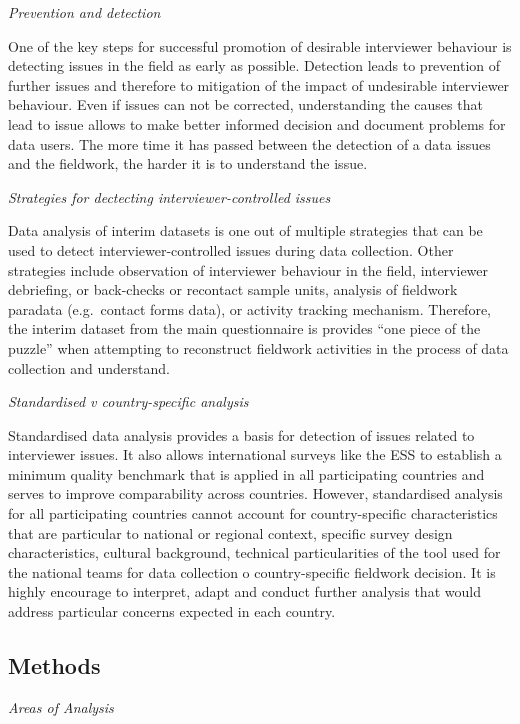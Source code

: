 \documentclass[
  11pt,
  a4paperpaper,
]{article}
\begin{document}
\emph{Prevention and detection}

One of the key steps for successful promotion of desirable interviewer
behaviour is detecting issues in the field as early as possible.
Detection leads to prevention of further issues and therefore to
mitigation of the impact of undesirable interviewer behaviour. Even if
issues can not be corrected, understanding the causes that lead to issue
allows to make better informed decision and document problems for data
users. The more time it has passed between the detection of a data
issues and the fieldwork, the harder it is to understand the issue.

\emph{Strategies for dectecting interviewer-controlled issues}

Data analysis of interim datasets is one out of multiple strategies that
can be used to detect interviewer-controlled issues during data
collection. Other strategies include observation of interviewer
behaviour in the field, interviewer debriefing, or back-checks or
recontact sample units, analysis of fieldwork paradata (e.g.~contact
forms data), or activity tracking mechanism. Therefore, the interim
dataset from the main questionnaire is provides ``one piece of the
puzzle'' when attempting to reconstruct fieldwork activities in the
process of data collection and understand.

\emph{Standardised v country-specific analysis}

Standardised data analysis provides a basis for detection of issues
related to interviewer issues. It also allows international surveys like
the ESS to establish a minimum quality benchmark that is applied in all
participating countries and serves to improve comparability across
countries. However, standardised analysis for all participating
countries cannot account for country-specific characteristics that are
particular to national or regional context, specific survey design
characteristics, cultural background, technical particularities of the
tool used for the national teams for data collection o country-specific
fieldwork decision. It is highly encourage to interpret, adapt and
conduct further analysis that would address particular concerns expected
in each country.

\hypertarget{methods}{%
\subsection{Methods}\label{methods}}

\emph{Areas of Analysis}
\end{document}
